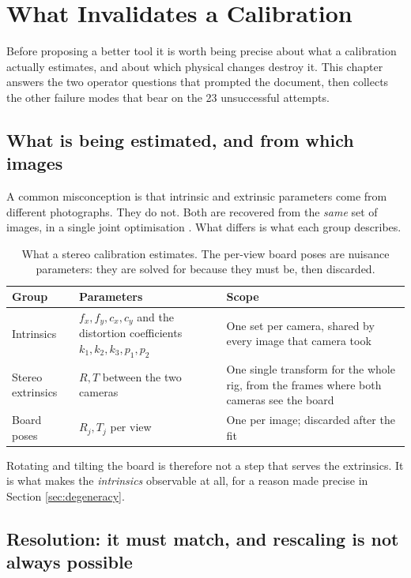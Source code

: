 \chapter{What Invalidates a Calibration}
\label{chap:failure}

Before proposing a better tool it is worth being precise about what a calibration actually estimates, and about which physical changes destroy it. This chapter answers the two operator questions that prompted the document, then collects the other failure modes that bear on the 23 unsuccessful attempts.

\section{What is being estimated, and from which images}

A common misconception is that intrinsic and extrinsic parameters come from different photographs. They do not. Both are recovered from the \emph{same} set of images, in a single joint optimisation \cite{zhang2000flexible}. What differs is what each group describes.

\begin{table}[!ht]
\centering
\small
\caption[Parameters recovered by a stereo calibration]{What a stereo calibration estimates. The per-view board poses are nuisance parameters: they are solved for because they must be, then discarded.}
\label{tab:params}
\begin{tabularx}{\textwidth}{p{} p{} X}
\toprule
\textbf{Group} & \textbf{Parameters} & \textbf{Scope} \\
\midrule
Intrinsics & $f_x, f_y, c_x, c_y$ and the distortion coefficients $k_1, k_2, k_3, p_1, p_2$ & One set per camera, shared by every image that camera took \\
Stereo extrinsics & $R, T$ between the two cameras & One single transform for the whole rig, from the frames where both cameras see the board \\
Board poses & $R_j, T_j$ per view & One per image; discarded after the fit \\
\bottomrule
\end{tabularx}
\end{table}

Rotating and tilting the board is therefore not a step that serves the extrinsics. It is what makes the \emph{intrinsics} observable at all, for a reason made precise in Section \ref{sec:degeneracy}.

\section{Resolution: it must match, and rescaling is not always possible}
\label{sec:resolution}

